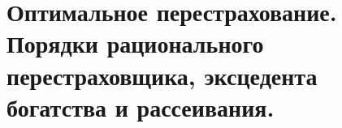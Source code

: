 \chapter{Оптимальное перестрахование. Порядки рационального перестраховщика, эксцедента богатства и рассеивания.}